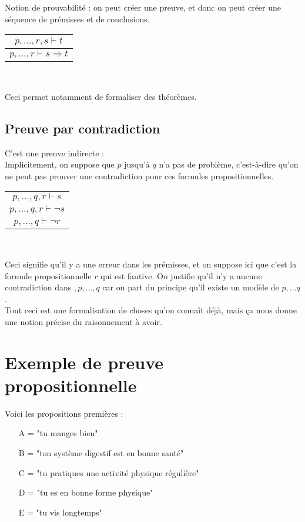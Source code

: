 			Notion de prouvabilité : on peut créer une preuve, et donc on peut créer une séquence de prémisses et de conclusions.
			\begin{center}
			\begin{tabular}{c}
      		$p,...,r,s \vdash t$ \\
      		\hline
      		$p,...,r \vdash s\Rightarrow t$\\
   			\end{tabular}\\
			\end{center}
			Ceci permet notamment de formaliser des théorèmes.
			
		\subsection*{Preuve par contradiction}
		C'est une preuve indirecte :\\
		Implicitement, on suppose que $p$ jusqu'à $q$ n'a pas de problème, c'est-à-dire qu'on ne peut pas prouver une contradiction pour ces formules propositionnelles.
		\begin{center}
			\begin{tabular}{c}
      		$p,...,q,r \vdash s$ \\
      		$p,...,q,r \vdash \lnot s$\\
      		\hline
      		$p,...,q \vdash \lnot r$\\
   			\end{tabular}\\
			\end{center}
			
			Ceci signifie qu'il y a une erreur dans les prémisses, et on suppose ici que c'est la formule propositionnelle $r$ qui est fautive. On justifie qu'il n'y a aucune contradiction dans $,p,...,q$ car on part du principe qu'il existe un modèle de $p,...q$.\\
			
			Tout ceci est une formalisation de choses qu'on connaît déjà, mais ça nous donne une notion précise du raisonnement à avoir.
			
\section{Exemple de preuve propositionnelle}

Voici les propositions premières :
\begin{enumerate}
\item[A =] "tu manges bien"
\item[B =] "ton système digestif est en bonne santé"
\item[C =] "tu pratiques une activité physique régulière"
\item[D =] "tu es en bonne forme physique"
\item[E =] "tu vis longtemps"
\end{enumerate}

